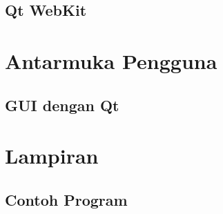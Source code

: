 \documentclass[11pt,b5paper,twoside,titlepage]{book}
\begin{document}
	\chapter{Qt WebKit}\label{qt-webkit}
	

	\part{Antarmuka Pengguna}\label{part-interface}

	\chapter{GUI dengan Qt}\label{gui}
	

	\appendix

	\backmatter
	\part{Lampiran}\label{part-lampiran}

	\chapter{Contoh Program}
	
	\printindex
	
\end{document}
